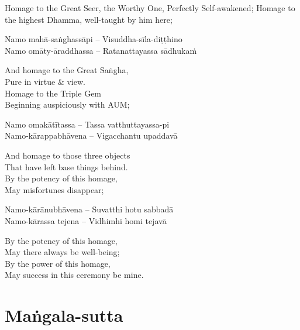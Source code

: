 \begin{english-verses}
  Homage to the Great Seer, the Worthy One, Perfectly Self-awakened; Homage to the highest Dhamma, well-taught by him here;
\end{english-verses}

Namo mahā-saṅghassāpi – Visuddha-sīla-diṭṭhino\\
Namo omāty-āraddhassa – Ratanattayassa sādhukaṁ

\begin{english-verses}
  And homage to the Great Saṅgha,\\
  Pure in virtue \& view.\\
  Homage to the Triple Gem\\
  Beginning auspiciously with AUM;
\end{english-verses}

Namo omakātītassa – Tassa vatthuttayassa-pi\\
Namo-kārappabhāvena – Vigacchantu upaddavā\\

\begin{english-verses}
  And homage to those three objects\\
  That have left base things behind.\\
  By the potency of this homage,\\
  May misfortunes disappear;
\end{english-verses}

Namo-kārānubhāvena – Suvatthi hotu sabbadā\\
Namo-kārassa tejena – Vidhimhi homi tejavā

\begin{english-verses}
  By the potency of this homage,\\
  May there always be well-being;\\
  By the power of this homage,\\
  May success in this ceremony be mine.
\end{english-verses}

\suttaRef{[Thai]}

\section{Maṅgala-sutta}
\label{mangala-sutta}


